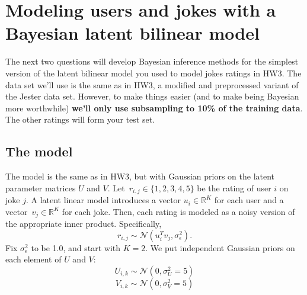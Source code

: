 \documentclass{harvardml}
\newcommand{\R}{\mathbb{R}}
\theoremstyle{plain}
\begin{document}
\newpage

\section*{Modeling users and jokes with a Bayesian latent bilinear model}

The next two questions will develop Bayesian inference methods for the simplest version of the latent bilinear model you used to model jokes ratings in HW3. The data set we'll use is the same as in HW3, a modified and preprocessed variant of the Jester data set. However, to make things easier (and to make being Bayesian more worthwhile) {\bf we'll only use subsampling to 10\% of the training data}.  The other ratings will form your test set.

\subsection*{The model}

The model is the same as in HW3, but with Gaussian priors on the latent parameter matrices $U$ and $V$. Let~${r_{i,j}\in\{1,2,3,4,5\}}$ be the rating of user $i$ on joke $j$.  A latent linear model introduces a vector ${u_i\in\R^K}$ for each user and a vector~${v_j\in\R^K}$ for each joke.  Then, each rating is modeled as a noisy version of the appropriate inner product. Specifically,
\[
r_{i,j} \sim \mathcal{N}(u_i^T v_j, \sigma_\epsilon^2).
\]
Fix $\sigma_\epsilon^2$ to be 1.0, and start with $K = 2$. We put independent Gaussian priors on each element of $U$ and $V$:
\[U_{i,k} \sim \mathcal{N}(0, \sigma_U^2=5)\]
\[V_{i,k} \sim \mathcal{N}(0, \sigma_V^2=5)\]
\end{document}
